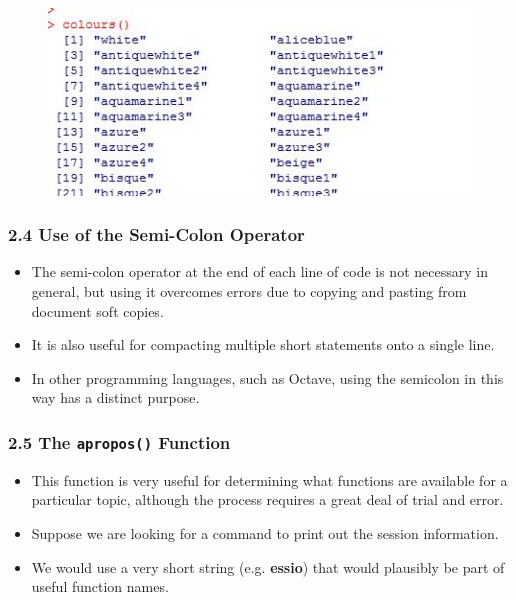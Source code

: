 \documentclass{beamer}
\begin{document}
 	\begin{frame}
 		\begin{figure}
 			\centering
 			\includegraphics[width=1.2\linewidth]{images/Rcolours}
 		\end{figure}
 		
 	\end{frame}
 	
 	\begin{frame}
 		\frametitle{2.4 Use of the Semi-Colon Operator}
 		\begin{itemize}
 			\item The semi-colon operator at the end of each line of code is not necessary in general, but using it
 			overcomes errors due to copying and pasting from document soft copies. 
 			\item It is also useful for compacting multiple short statements onto a single line.
 			\item In other programming
 			languages, such as Octave, using the semicolon in this way has a distinct purpose.
 		\end{itemize}
 	\end{frame}
 	\begin{frame}
 		\frametitle{2.5 The \texttt{apropos()} Function}
 		\begin{itemize}
 		\item This function is very useful for determining what functions are available for a particular topic,
 		although the process requires a great deal of trial and error. 
 		\item Suppose we are looking for a
 		command to print out the session information. 
 		\item We would use a very short string (e.g. \textbf{essio})
 		that would plausibly be part of useful function names.
 		\end{itemize}
 	\end{frame}
 	
\end{document}
